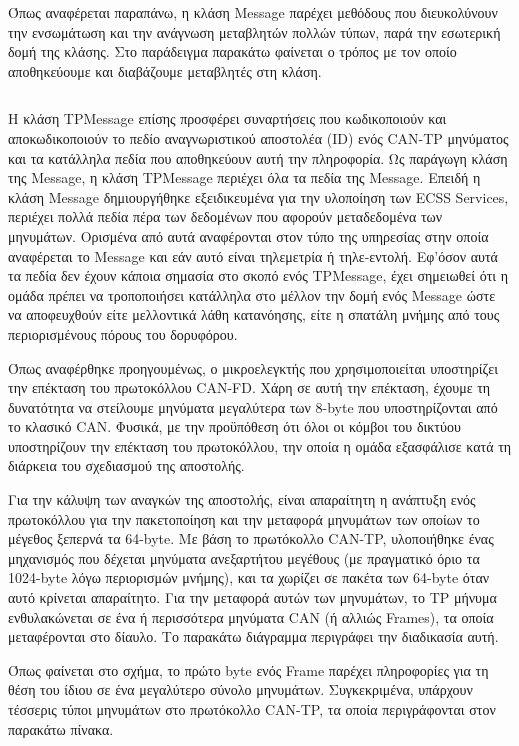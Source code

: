 \documentclass[a4paper,nobib,justified]{tufte-book}
\begin{document}
Όπως αναφέρεται παραπάνω, η κλάση Message παρέχει μεθόδους που διευκολύνουν την ενσωμάτωση και την ανάγνωση μεταβλητών πολλών τύπων, παρά την εσωτερική δομή της κλάσης. Στο παράδειγμα παρακάτω φαίνεται ο τρόπος με τον οποίο αποθηκεύουμε και διαβάζουμε μεταβλητές στη κλάση.
\inputminted{cpp}{code/examples/ecss-message-usage.cpp}

Η κλάση TPMessage επίσης προσφέρει συναρτήσεις που κωδικοποιούν και αποκωδικοποιούν το πεδίο αναγνωριστικού αποστολέα (ID) ενός CAN-TP μηνύματος και τα κατάλληλα πεδία που αποθηκεύουν αυτή την πληροφορία. Ως παράγωγη κλάση της Message, η κλάση TPMessage περιέχει όλα τα πεδία της Message. Επειδή η κλάση Message δημιουργήθηκε εξειδικευμένα για την υλοποίηση των ECSS Services, περιέχει πολλά πεδία πέρα των δεδομένων που αφορούν μεταδεδομένα των μηνυμάτων. Ορισμένα από αυτά αναφέρονται στον τύπο της υπηρεσίας στην οποία αναφέρεται το Message και εάν αυτό είναι τηλεμετρία ή τηλε-εντολή. Εφ'όσον αυτά τα πεδία δεν έχουν κάποια σημασία στο σκοπό ενός TPMessage, έχει σημειωθεί ότι η ομάδα πρέπει να τροποποιήσει κατάλληλα στο μέλλον την δομή ενός Message ώστε να αποφευχθούν είτε μελλοντικά λάθη κατανόησης, είτε η σπατάλη μνήμης από τους περιορισμένους πόρους του δορυφόρου. 

Όπως αναφέρθηκε προηγουμένως, ο μικροελεγκτής που χρησιμοποιείται υποστηρίζει την επέκταση του πρωτοκόλλου CAN-FD. Χάρη σε αυτή την επέκταση, έχουμε τη δυνατότητα να στείλουμε μηνύματα μεγαλύτερα των 8-byte που υποστηρίζονται από το κλασικό CAN. Φυσικά, με την προϋπόθεση ότι όλοι οι κόμβοι του δικτύου υποστηρίζουν την επέκταση του πρωτοκόλλου, την οποία η ομάδα εξασφάλισε κατά τη διάρκεια του σχεδιασμού της αποστολής.

Για την κάλυψη των αναγκών της αποστολής, είναι απαραίτητη η ανάπτυξη ενός πρωτοκόλλου για την πακετοποίηση και την μεταφορά μηνυμάτων των οποίων το μέγεθος ξεπερνά τα 64-byte. Με βάση το πρωτόκολλο CAN-TP, υλοποιήθηκε ένας μηχανισμός που δέχεται μηνύματα ανεξαρτήτου μεγέθους (με πραγματικό όριο τα 1024-byte λόγω περιορισμών μνήμης), και τα χωρίζει σε πακέτα των 64-byte όταν αυτό κρίνεται απαραίτητο. Για την μεταφορά αυτών των μηνυμάτων, το TP μήνυμα ενθυλακώνεται σε ένα ή περισσότερα μηνύματα CAN (ή αλλιώς Frames), τα οποία μεταφέρονται στο δίαυλο. Το παρακάτω διάγραμμα περιγράφει την διαδικασία αυτή. 


Όπως φαίνεται στο σχήμα, το πρώτο byte ενός Frame παρέχει πληροφορίες για τη θέση του ίδιου σε ένα μεγαλύτερο σύνολο μηνυμάτων. Συγκεκριμένα, υπάρχουν τέσσερις τύποι μηνυμάτων στο πρωτόκολλο CAN-TP, τα οποία περιγράφονται στον παρακάτω πίνακα.
\end{document}
